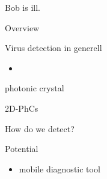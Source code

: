 


\frame{\maketitle}

\begin{frame}
  Bob is ill.
\end{frame}

\begin{frame}{Overview}
\tableofcontents
\end{frame}

\begin{frame}{Virus detection in generell}
  \begin{itemize}
    \item
  \end{itemize}
\end{frame}

\begin{frame}{photonic crystal}
\end{frame}

\begin{frame}{2D-PhCs}

\end{frame}

\begin{frame}{How do we detect?}

\end{frame}

\begin{frame}{Potential}
  \begin{itemize}
    \item { mobile diagnostic tool}
  \end{itemize}
\end{frame}

\begin{frame}
  \nocite{*}
  \printbibliography
\end{frame}

